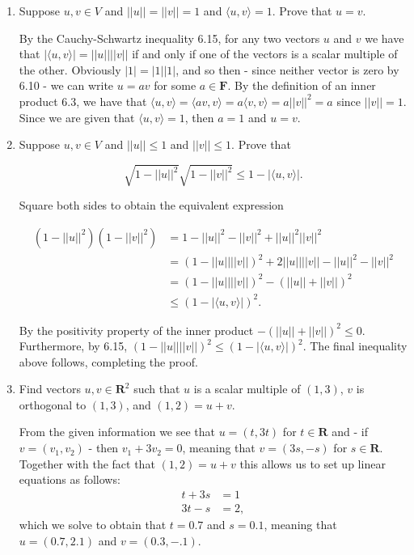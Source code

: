 \documentclass{book}
\begin{document}
\begin{enumerate}
\item Suppose \(u,v \in V\) and \(||u||=||v||=1\) and \(\langle u,v \rangle = 1\).  Prove that \(u=v\).

By the Cauchy-Schwartz inequality 6.15, for any two vectors \(u\) and \(v\) we have that \(|\langle u,v \rangle| = ||u||||v||\) if and only if one of the vectors is a scalar multiple of the other.  Obviously \(|1|=|1||1|\), and so then - since neither vector is zero by 6.10 - we can write \(u=av\) for some \(a \in \textbf{F}\).  By the definition of an inner product 6.3, we have that \(\langle u,v \rangle = \langle av,v \rangle = a \langle v,v \rangle = a||v||^2=a\) since \(||v||=1\).  Since we are given that \(\langle u,v \rangle = 1\), then \(a=1\) and \(u=v\).

\item Suppose \(u,v \in V\) and \(||u|| \leq 1\) and \(||v|| \leq 1\).  Prove that

\begin{equation*}
    \sqrt{1-||u||^2}\sqrt{1-||v||^2} \leq 1-|\langle u,v \rangle|.
\end{equation*}

Square both sides to obtain the equivalent expression

\begin{equation*}
    \begin{split}
        (1-||u||^2)(1-||v||^2) &= 1 - ||u||^2 - ||v||^2 + ||u||^2||v||^2 \\
        &= (1-||u||||v||)^2+2||u||||v||-||u||^2-||v||^2 \\
        &= (1-||u||||v||)^2-(||u||+||v||)^2 \\
        &\leq (1-|\langle u,v \rangle |)^2.
    \end{split}
\end{equation*}

By the positivity property of the inner product \(-(||u||+||v||)^2 \leq 0\).  Furthermore, by 6.15, \((1-||u||||v||)^2 \leq (1-|\langle u,v \rangle |)^2\).  The final inequality above follows, completing the proof.

\item Find vectors \(u,v \in \textbf{R}^2\) such that \(u\) is a scalar multiple of \((1,3)\), \(v\) is orthogonal to \((1,3)\), and \((1,2)=u+v\).

From the given information we see that \(u=(t,3t)\) for \(t \in \textbf{R}\) and - if \(v=(v_1,v_2)\) - then \(v_1+3v_2=0\), meaning that \(v=(3s,-s)\) for \(s \in \textbf{R}\).  Together with the fact that \((1,2)=u+v\) this allows us to set up linear equations as follows:
\begin{align*}
t+3s&=1 \\
3t-s&=2,
\end{align*}
which we solve to obtain that \(t=0.7\) and \(s=0.1\), meaning that \(u=(0.7,2.1)\) and \(v=(0.3,-.1)\).


\end{enumerate}
\end{document}
